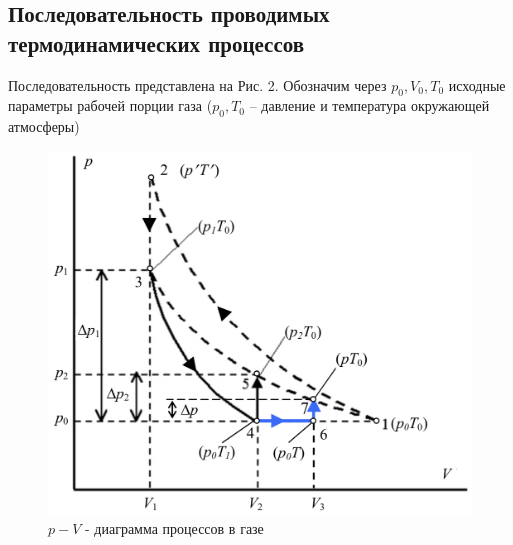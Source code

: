 \documentclass[a4paper,12pt]{article}
\theoremstyle{plain} %
\theoremstyle{definition} %
\theoremstyle{remark} %
\begin{document}
\subsection{Последовательность проводимых термодинамических процессов}
Последовательность представлена на Рис. 2. Обозначим через $p_0, V_0, T_0$ исходные параметры рабочей порции газа ($p_0, T_0$ -- давление и температура окружающей атмосферы)
\begin{figure}[H]
	\begin{center}
		\includegraphics[width=0.7\linewidth]{2}
				\captionsetup{justification=centering}
		\caption{$p-V$ - диаграмма процессов в газе}
	\end{center}
\end{figure}
\end{document}
